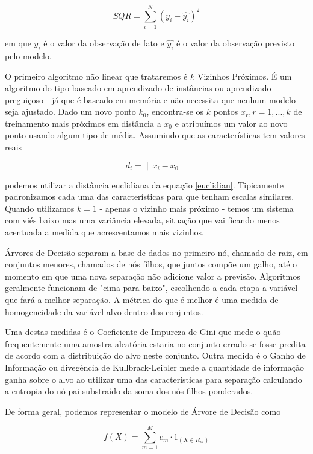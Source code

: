 \documentclass[twocolumn]{rbef}
\newcommand{\1}{\mathbbm{1}}
\begin{document}
\begin{equation}
    SQR = \sum_{i=1}^{N} (y_{i} - \hat{y_{i}})^{2}
\end{equation}

em que $y_{i}$ é o valor da observação de fato e $\hat{y_{i}}$ é o valor da observação previsto pelo modelo.

O primeiro algoritmo não linear que trataremos é $k$ Vizinhos Próximos. É um algoritmo do tipo baseado em aprendizado de instâncias ou aprendizado preguiçoso - já que é baseado em memória e não necessita que nenhum modelo seja ajustado. Dado um novo ponto $k_{0}$, encontra-se os $k$ pontos $x_{r}, r=1,...,k$ de treinamento mais próximos em distância a $x_{0}$ e atribuímos um valor ao novo ponto usando algum tipo de média. Assumindo que as características tem valores reais\cite{Hastie}

\begin{equation}\label{euclidian}
    d_{i} = \| x_{i} - x_{0} \|
\end{equation}

podemos utilizar a distância euclidiana da equação \ref{euclidian}. Tipicamente padronizamos cada uma das características para que tenham escalas similares. Quando utilizamos $k=1$ - apenas o vizinho mais próximo - temos um sistema com viés baixo mas uma variância elevada, situação que vai ficando menos acentuada a medida que acrescentamos mais vizinhos.

Árvores de Decisão separam a base de dados no primeiro nó, chamado de raiz, em conjuntos menores, chamados de nós filhos, que juntos compõe um galho, até o momento em que uma nova separação não adicione valor a previsão. Algoritmos geralmente funcionam de "cima para baixo", escolhendo a cada etapa a variável que fará a melhor separação. A métrica do que é melhor é uma medida de homogeneidade da variável alvo dentro dos conjuntos.

Uma destas medidas é o Coeficiente de Impureza de Gini que mede o quão frequentemente uma amostra aleatória estaria no conjunto errado se fosse predita de acordo com a distribuição do alvo neste conjunto. Outra medida é o Ganho de Informação ou divegência de Kullbrack-Leibler\cite{Kullbrack} mede a quantidade de informação ganha sobre o alvo ao utilizar uma das características para separação calculando a entropia do nó pai substraído da soma dos nós filhos ponderados.

De forma geral, podemos representar o modelo de Árvore de Decisão como\cite{James}

\begin{equation}
    f(X) = \sum_{m=1}^{M} c_{m} \cdot 1_{(X \in R_{m})}
\end{equation}
\end{document}
